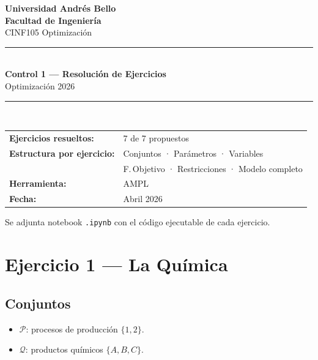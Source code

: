 \documentclass[12pt,a4paper]{article}
\begin{document}

\begin{titlepage}
\centering\vspace*{1.5cm}
{\Large\bfseries\color{unabazul}Universidad Andrés Bello\\[0.3em]Facultad de Ingeniería}\\[0.4em]
{\large CINF105 Optimización}\\[2cm]
\rule{\linewidth}{1.2pt}\\[0.5em]
{\LARGE\bfseries Control 1 — Resolución de Ejercicios}\\[0.4em]
{\large\color{unabgris}Optimización 2026}\\[0.3em]
\rule{\linewidth}{1.2pt}\\[1.5cm]
\begin{tabular}{@{}ll@{}}
  \textbf{Ejercicios resueltos:} & 7 de 7 propuestos\\[0.4em]
  \textbf{Estructura por ejercicio:} & Conjuntos · Parámetros · Variables\\
                                     & F.\,Objetivo · Restricciones · Modelo completo\\[0.4em]
  \textbf{Herramienta:}          & AMPL\\[0.4em]
  \textbf{Fecha:}                & Abril 2026\\
\end{tabular}
\vfill
{\small Se adjunta notebook \texttt{.ipynb} con el código ejecutable de cada ejercicio.}
\end{titlepage}

\tableofcontents\clearpage

\section{Ejercicio 1 — La Química}

\subsection{Conjuntos}

\begin{conjbox}
\begin{itemize}[leftmargin=1.5em]
  \item $\mathcal{P}$: procesos de producción $\{1, 2\}$.
  \item $\mathcal{Q}$: productos químicos $\{A, B, C\}$.
\end{itemize}
\end{conjbox}
\end{document}
